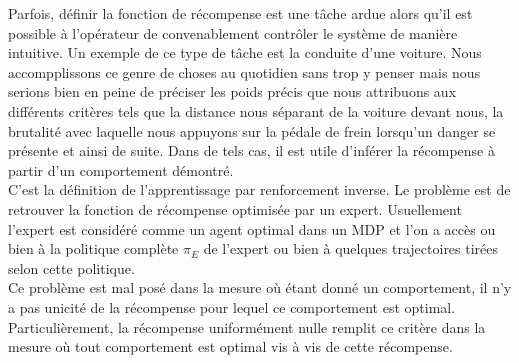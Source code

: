\documentclass[publibook-draft]{CAp2012}
\begin{document}
Parfois, définir la fonction de récompense est une tâche ardue alors qu'il est possible à l'opérateur de convenablement contrôler le système de manière intuitive. Un exemple de ce type de tâche est la conduite d'une voiture. Nous accompplissons ce genre de choses au quotidien sans trop y penser mais nous serions bien en peine de préciser les poids précis que nous attribuons aux différents critères tels que la distance nous séparant de la voiture devant nous, la brutalité avec laquelle nous appuyons sur la pédale de frein lorsqu'un danger se présente et ainsi de suite. Dans de tels cas, il est utile d'inférer la récompense à partir d'un comportement démontré.\\

C'est la définition de l'apprentissage par renforcement inverse. Le problème est de retrouver la fonction de récompense optimisée par un expert. Usuellement l'expert est considéré comme un agent optimal dans un MDP et l'on a accès ou bien à la politique complète $\pi_E$ de l'expert ou bien à quelques trajectoires tirées selon cette politique.\\

Ce problème est mal posé dans la mesure où étant donné un comportement, il n'y a pas unicité de la récompense pour lequel ce comportement est optimal. Particulièrement, la récompense uniformément nulle remplit ce critère dans la mesure où tout comportement est optimal vis à vis de cette récompense.
\end{document}
